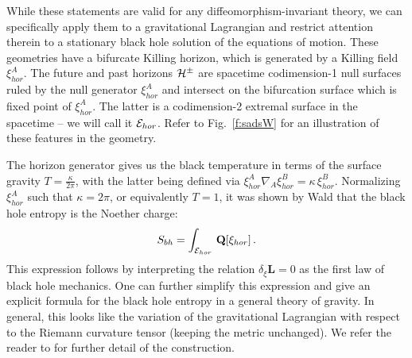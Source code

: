\documentclass[12pt,openany]{book}
\begin{document}
While these statements are valid for any diffeomorphism-invariant theory, we can specifically apply them to a gravitational Lagrangian  and restrict attention therein to a stationary black hole solution of the equations of motion. These geometries have a bifurcate Killing horizon, which is generated by a Killing field $\xi_{hor}^A$. The future and past horizons ${\cal H}^\pm$  are spacetime codimension-1 null surfaces ruled by the null generator $\xi_{hor}^A$ and intersect on the bifurcation surface which is fixed point of $\xi_{hor}^A$. The latter is a codimension-2 extremal surface in the spacetime -- we will call it ${\cal E}_{hor}$. Refer to  Fig.~\ref{f:sadsW} for an illustration of these features in the \SAdS{} geometry.

The horizon generator gives us the black temperature in terms of the surface gravity   $T = \frac{\kappa}{2\pi}$, with the latter being defined via $\xi^A_{hor}\nabla_A \xi^B_{hor} = \kappa\, \xi^B_{hor}$. Normalizing $\xi^A_{hor}$ such that $\kappa =2\pi$, or equivalently $T=1$, it was shown by Wald \cite{Wald:1993nt} that the black hole entropy is the Noether charge:
%
\begin{equation}
S_{bh} = \int_{{\cal E}_{hor}}  \, \mathbf{Q}[\xi_{hor}] \,.
\label{eq:noeW}
\end{equation}
%
This expression follows by interpreting the relation $\delta_\xi \mathbf{L}=0$ as the first law of black hole mechanics. One can further simplify this expression and give an explicit formula for the black hole entropy in a general theory of gravity. In general, this looks like the variation of the gravitational Lagrangian with respect to the Riemann curvature tensor (keeping the metric unchanged). We refer the reader to \cite{Iyer:1994ys} for further detail of the construction.
\end{document}
